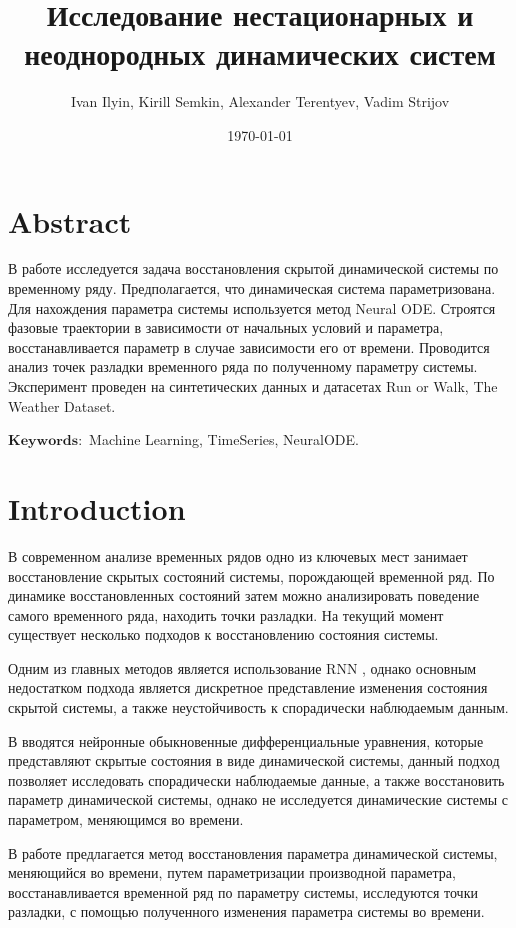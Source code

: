 \documentclass[a4paper,14pt]{article}
\author{Ivan Ilyin, Kirill Semkin, Alexander Terentyev, Vadim Strijov}
\title{\textbf{Исследование нестационарных и неоднородных динамических систем}}
\date{\today}
\theoremstyle{plain} %
\theoremstyle{definition} %
\theoremstyle{remark} %
\begin{document}
	\maketitle
	\section{Abstract}
	В работе исследуется задача восстановления скрытой динамической системы по временному ряду. Предполагается, что динамическая система параметризована. Для нахождения параметра системы используется метод Neural ODE. Строятся фазовые траектории в зависимости от начальных условий и параметра, восстанавливается параметр в случае зависимости его от времени. Проводится анализ точек разладки временного ряда по полученному параметру системы. Эксперимент проведен на синтетических данных и датасетах Run or Walk, The Weather Dataset.

	$\mathbf{Keywords:}$ Machine Learning, TimeSeries, NeuralODE.
        
	\section{Introduction}
        В современном анализе временных рядов одно из ключевых мест занимает восстановление скрытых состояний системы, порождающей временной ряд. По динамике восстановленных состояний затем можно анализировать поведение самого временного ряда, находить точки разладки. На текущий момент существует несколько подходов к восстановлению состояния системы.

        Одним из главных методов является использование RNN \citep{strobelt2017lstmvis}, однако основным недостатком подхода является дискретное представление изменения состояния скрытой системы, а также неустойчивость к спорадически наблюдаемым данным.

        В \citep{NEURIPS2018_69386f6b} вводятся нейронные обыкновенные дифференциальные уравнения, которые представляют скрытые состояния в виде динамической системы, данный подход позволяет исследовать спорадически наблюдаемые данные, а также восстановить параметр динамической системы, однако не исследуется динамические системы с параметром, меняющимся во времени.

        В работе предлагается метод восстановления параметра динамической системы, меняющийся во времени, путем параметризации производной параметра, восстанавливается временной ряд по параметру системы, исследуются точки разладки, с помощью полученного изменения параметра системы во времени.
        
\end{document}

